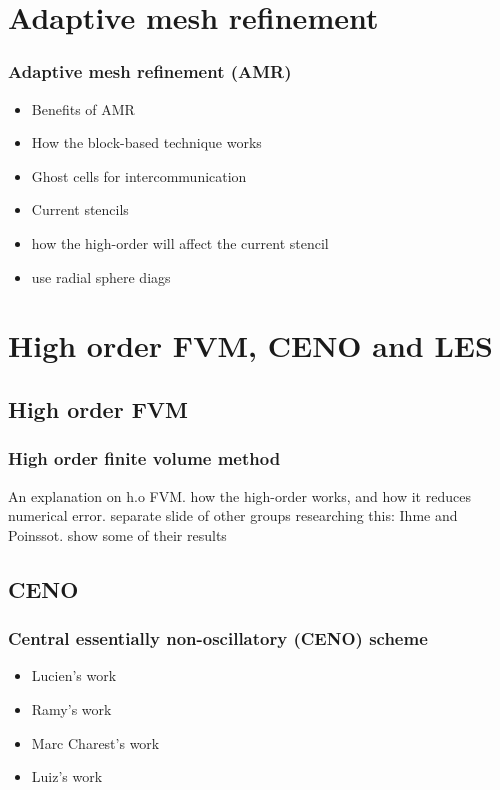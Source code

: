 \documentclass{beamer}
\begin{document}
\section[AMR]{Adaptive mesh refinement}
\begin{frame}%
\frametitle{Adaptive mesh refinement (AMR)}
\scriptsize
\begin{itemize}
\item Benefits of AMR
\item How the block-based technique works
\item Ghost cells for intercommunication
\item Current stencils
\item how the high-order will affect the current stencil
\item use radial sphere diags
\end{itemize}
\end{frame}






\section[FVM]{High order FVM, CENO and LES}
\subsection{High order FVM}
\begin{frame}%
\frametitle{High order finite volume method}
\scriptsize
An explanation on h.o FVM.
how the high-order works, and how it reduces numerical error.
separate slide of other groups researching this: Ihme and Poinssot. show some of their results
\end{frame}


\subsection{CENO}
\begin{frame}
\scriptsize
\frametitle{Central essentially non-oscillatory (CENO) scheme}
\begin{itemize}
\item Lucien's work
\item Ramy's work
\item Marc Charest's work
\item Luiz's work
\end{itemize}
\end{frame}
\end{document}
